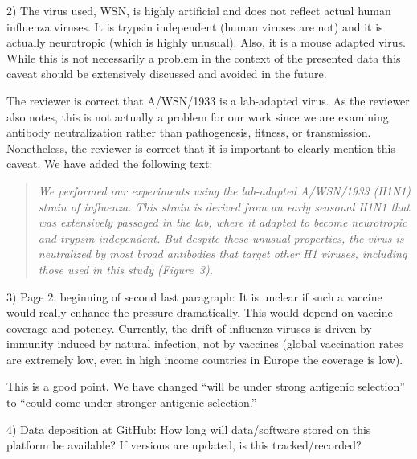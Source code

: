 \documentclass[11pt, oneside]{article}   	%
\begin{document}
2) The virus used, WSN, is highly artificial and does not reflect actual human influenza viruses. It is trypsin independent (human viruses are not) and it is actually neurotropic (which is highly unusual). Also, it is a mouse adapted virus. While this is not necessarily a problem in the context of the presented data this caveat should be extensively discussed and avoided in the future.

{\color{black}
The reviewer is correct that A/WSN/1933 is a lab-adapted virus.
As the reviewer also notes, this is not actually a problem for our work since we are examining antibody neutralization rather than pathogenesis, fitness, or transmission. 
Nonetheless, the reviewer is correct that it is important to clearly mention this caveat. 
We have added the following text:

\begin{quote}
\textsl{We performed our experiments using the lab-adapted A/WSN/1933 (H1N1) strain of influenza.
This strain is derived from an early seasonal H1N1 that was extensively passaged in the lab, where it adapted to become neurotropic and trypsin independent.
But despite these unusual properties, the virus is neutralized by most broad antibodies that target other H1 viruses, including those used in this study (Figure~3).}
\end{quote}
}

3) Page 2, beginning of second last paragraph: It is unclear if such a vaccine would really enhance the pressure dramatically. This would depend on vaccine coverage and potency. Currently, the drift of influenza viruses is driven by immunity induced by natural infection, not by vaccines (global vaccination rates are extremely low, even in high income countries in Europe the coverage is low).

{\color{black}
This is a good point. We have changed ``will be under strong antigenic selection'' to ``could come under stronger antigenic selection.''
}

4) Data deposition at GitHub: How long will data/software stored on this platform be available? If versions are updated, is this tracked/recorded? 
\end{document}

